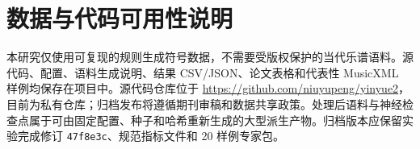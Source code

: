\section*{数据与代码可用性说明}

本研究仅使用可复现的规则生成符号数据，不需要受版权保护的当代乐谱语料。源代码、配置、语料生成说明、结果 CSV/JSON、论文表格和代表性 MusicXML 样例均保存在项目中。源代码仓库位于 \url{https://github.com/niuyupeng/yinyue2}，目前为私有仓库；归档发布将遵循期刊审稿和数据共享政策。处理后语料与神经检查点属于可由固定配置、种子和哈希重新生成的大型派生产物。归档版本应保留实验完成修订 \texttt{47f8e3c}、规范指标文件和 20 样例专家包。
